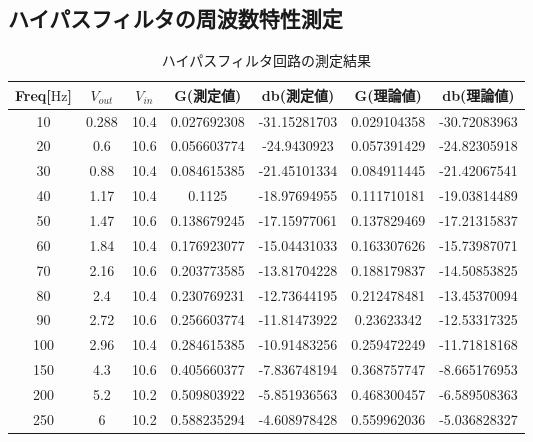 \documentclass[a4paper,11pt]{jsarticle}
\begin{document}
\subsection{ハイパスフィルタの周波数特性測定}
\begin{center}
  \begin{longtable}{|c|c|c|c|c|c|c|}
    \caption{ハイパスフィルタ回路の測定結果}
    \label{T:HPF_result}
    \endhead
    \hline
    Freq[$\si{\hertz}$] & $V_{out}$ & $V_{in}$ & G(測定値)   & db(測定値)   & G(理論値)   & db(理論値)   \\ \hline
    10                  & 0.288     & 10.4     & 0.027692308 & -31.15281703 & 0.029104358 & -30.72083963 \\ \hline
    20                  & 0.6       & 10.6     & 0.056603774 & -24.9430923  & 0.057391429 & -24.82305918 \\ \hline
    30                  & 0.88      & 10.4     & 0.084615385 & -21.45101334 & 0.084911445 & -21.42067541 \\ \hline
    40                  & 1.17      & 10.4     & 0.1125      & -18.97694955 & 0.111710181 & -19.03814489 \\ \hline
    50                  & 1.47      & 10.6     & 0.138679245 & -17.15977061 & 0.137829469 & -17.21315837 \\ \hline
    60                  & 1.84      & 10.4     & 0.176923077 & -15.04431033 & 0.163307626 & -15.73987071 \\ \hline
    70                  & 2.16      & 10.6     & 0.203773585 & -13.81704228 & 0.188179837 & -14.50853825 \\ \hline
    80                  & 2.4       & 10.4     & 0.230769231 & -12.73644195 & 0.212478481 & -13.45370094 \\ \hline
    90                  & 2.72      & 10.6     & 0.256603774 & -11.81473922 & 0.23623342  & -12.53317325 \\ \hline
    100                 & 2.96      & 10.4     & 0.284615385 & -10.91483256 & 0.259472249 & -11.71818168 \\ \hline
    150                 & 4.3       & 10.6     & 0.405660377 & -7.836748194 & 0.368757747 & -8.665176953 \\ \hline
    200                 & 5.2       & 10.2     & 0.509803922 & -5.851936563 & 0.468300457 & -6.589508363 \\ \hline
    250                 & 6         & 10.2     & 0.588235294 & -4.608978428 & 0.559962036 & -5.036828327 \\ \hline

\end{longtable}
\end{center}
\end{document}
